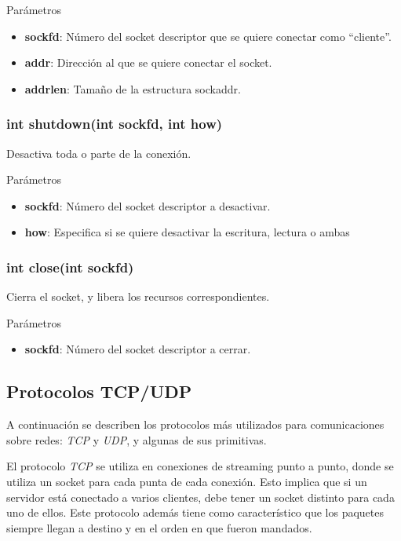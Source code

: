 \documentclass[a4paper, twoside]{article}
\begin{document}
\begin{parametros*}{Parámetros}
	\begin{itemize}
		\item \textbf{sockfd}: Número del socket descriptor que se quiere conectar como “cliente”.
		\item \textbf{addr}: Dirección al que se quiere conectar el socket.
		\item \textbf{addrlen}: Tamaño de la estructura sockaddr.
	\end{itemize}
\end{parametros*}

\subsubsection{int shutdown(int sockfd, int how)}
Desactiva toda o parte de la conexión.

\begin{parametros*}{Parámetros}
	\begin{itemize}
		\item \textbf{sockfd}: Número del socket descriptor a desactivar.
		\item \textbf{how}: Especifica si se quiere desactivar la escritura, lectura o ambas
	\end{itemize}
\end{parametros*}

\subsubsection{int close(int sockfd)}
Cierra el socket, y libera los recursos correspondientes.

\begin{parametros*}{Parámetros}
	\begin{itemize}
		\item \textbf{sockfd}: Número del socket descriptor a cerrar.
	\end{itemize}
\end{parametros*}

\subsection{Protocolos TCP/UDP}
A continuación se describen los protocolos más utilizados para comunicaciones sobre redes: \emph{TCP} y \emph{UDP}, y algunas de sus primitivas.

El protocolo \emph{TCP} se utiliza en conexiones de streaming punto a punto, donde se utiliza un socket para cada punta de cada conexión. Esto implica que si un servidor está conectado a varios clientes, debe tener un socket distinto para cada uno de ellos. Este protocolo además tiene como característico que los paquetes siempre llegan a destino y en el orden en que fueron mandados.
\end{document}

